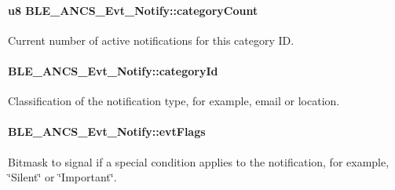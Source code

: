 \paragraph[{\texorpdfstring{category\+Count}{categoryCount}}]{\setlength{\rightskip}{0pt plus 5cm}u8 B\+L\+E\+\_\+\+A\+N\+C\+S\+\_\+\+Evt\+\_\+\+Notify\+::category\+Count}\hypertarget{struct_b_l_e___a_n_c_s___evt___notify_ac144c76d5e403f456b52a470b3cd543e}{}\label{struct_b_l_e___a_n_c_s___evt___notify_ac144c76d5e403f456b52a470b3cd543e}
Current number of active notifications for this category ID. 
\paragraph[{\texorpdfstring{category\+Id}{categoryId}}]{ B\+L\+E\+\_\+\+A\+N\+C\+S\+\_\+\+Evt\+\_\+\+Notify\+::category\+Id}\hypertarget{struct_b_l_e___a_n_c_s___evt___notify_a822feaaaeffd80d8abcc0656714b371a}{}\label{struct_b_l_e___a_n_c_s___evt___notify_a822feaaaeffd80d8abcc0656714b371a}
Classification of the notification type, for example, email or location. 
\paragraph[{\texorpdfstring{evt\+Flags}{evtFlags}}]{ B\+L\+E\+\_\+\+A\+N\+C\+S\+\_\+\+Evt\+\_\+\+Notify\+::evt\+Flags}\hypertarget{struct_b_l_e___a_n_c_s___evt___notify_a1e6bcdb7cc9e01b6f5d6b500488fdbc7}{}\label{struct_b_l_e___a_n_c_s___evt___notify_a1e6bcdb7cc9e01b6f5d6b500488fdbc7}
Bitmask to signal if a special condition applies to the notification, for example, \char`\"{}\+Silent\char`\"{} or \char`\"{}\+Important\char`\"{}. 
